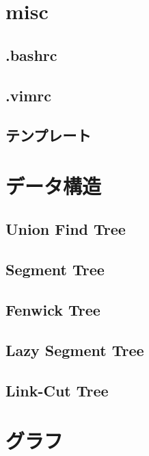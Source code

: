 \documentclass[landscape,twocolumn,9pt]{jsarticle}
\begin{document}
\tableofcontents
\clearpage

\section{misc}

\subsection{.bashrc}

\subsection{.vimrc}

\subsection{テンプレート}


\section{データ構造}

\subsection{Union Find Tree}

\subsection{Segment Tree}

\subsection{Fenwick Tree}

\subsection{Lazy Segment Tree}

\subsection{Link-Cut Tree}


\section{グラフ}
\end{document}
